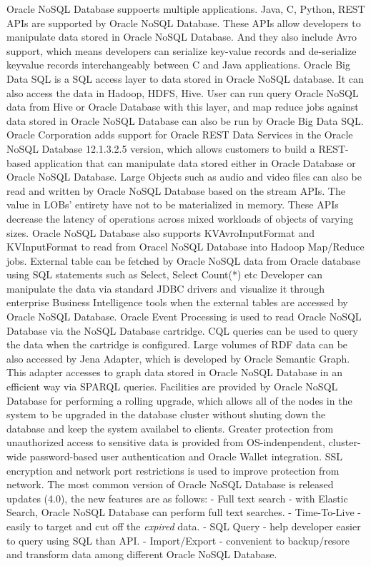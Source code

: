 Oracle NoSQL Database suppoerts multiple applications. 
Java, C, Python, REST APIs are supported by Oracle NoSQL Database. These APIs allow developers to manipulate data stored in Oracle NoSQL Database. And they also include Avro support, which means developers can serialize key-value records and de-serialize keyvalue records interchangeably between C and Java applications.\cite{hid-sp18-515-editor01}
Oracle Big Data SQL is a SQL access layer to data stored in Oracle NoSQL database. It can also access the data in Hadoop, HDFS, Hive. User can run query Oracle NoSQL data from Hive or Oracle Database with this layer, and map reduce jobs against data stored in Oracle NoSQL Database can also be run by Oracle Big Data SQL.\cite{hid-sp18-515-editor01}
Oracle Corporation adds support for Oracle REST Data Services in the Oracle NoSQL Database 12.1.3.2.5 version, which allows customers to build a REST-based application that can manipulate data stored either in Oracle Database or Oracle NoSQL Database. \cite{hid-sp18-515-editor01}
Large Objects such as audio and video files can also be read and written by Oracle NoSQL Database based on the stream APIs. The value in LOBs' entirety have not to be materialized in memory. These APIs decrease the latency of operations across mixed workloads of objects of varying sizes. \cite{hid-sp18-515-editor01}
Oracle NoSQL Database also supports KVAvroInputFormat and KVInputFormat to read from Oracel NoSQL Database into Hadoop Map/Reduce jobs. \cite{hid-sp18-515-editor01}
External table can be fetched by Oracle NoSQL data from Oracle database using SQL statements such as Select, Select Count(*) etc Developer can manipulate the data via standard JDBC drivers and visualize it through enterprise Business Intelligence tools when the external tables are accessed by Oracle NoSQL Database. \cite{hid-sp18-515-editor01}
Oracle Event Processing is used to read Oracle NoSQL Database via the NoSQL Database cartridge. CQL queries can be used to query the data when the cartridge is configured. Large volumes of RDF data can be also accessed by Jena Adapter, which is developed by Oracle Semantic Graph. This adapter accesses to graph data stored in Oracle NoSQL Database in an efficient way via SPARQL queries. \cite{hid-sp18-515-editor01}
Facilities are provided by Oracle NoSQL Database for performing a rolling upgrade, which allows all of the nodes in the system to be upgraded in the database cluster without shuting down the database and keep the system availabel to clients. \cite{hid-sp18-515-editor01}
Greater protection from unauthorized access to sensitive data is provided from OS-indenpendent, cluster-wide password-based user authentication and Oracle Wallet integration. SSL encryption and network port restrictions is used to improve protection from network. \cite{hid-sp18-515-editor01}
The most common version of Oracle NoSQL Database is released updates (4.0), the new features are as follows:
- Full text search - with Elastic Search, Oracle NoSQL Database can perform full text searches.
- Time-To-Live - easily to target and cut off the \emph{expired} data.
- SQL Query - help developer easier to query using SQL than API.
- Import/Export - convenient to backup/resore and transform data among different Oracle NoSQL Database. \cite{hid-sp18-515-editor00}

